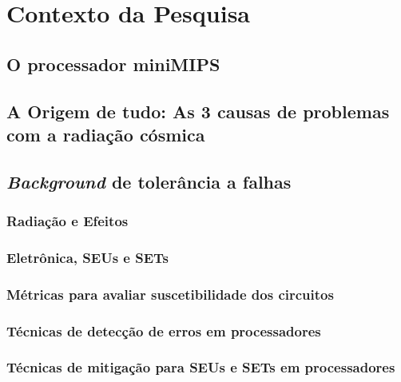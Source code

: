 \chapter{Contexto da Pesquisa}
\section{O processador miniMIPS}
\section{A Origem de tudo: As 3 causas de problemas com a radiação cósmica}
\section{\textit{Background} de tolerância a falhas}
	\subsection{Radiação e Efeitos}
	\subsection{Eletrônica, SEUs e SETs}
	\subsection{Métricas para avaliar suscetibilidade dos circuitos}
	\subsection{Técnicas de detecção de erros em processadores}
	\subsection{Técnicas de mitigação para SEUs e SETs em processadores}